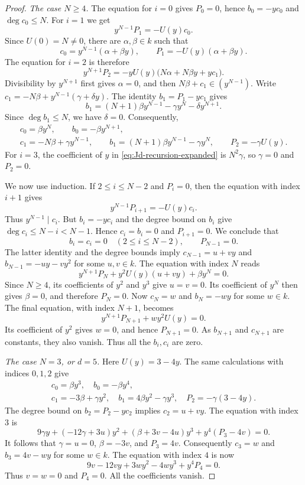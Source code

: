 \documentclass[11pt]{amsart} %
\theoremstyle{definition}
\begin{document}
\begin{proof}
\smallskip\noindent
\emph{The case $N\ge4$.}
The equation for $i=0$ gives $P_0=0$, hence $b_0=-yc_0$ and
$\deg c_0\le N$. For $i=1$ we get
\[
y^{N-1}P_1=-U(y)c_0.
\]
Since $U(0)=N\neq0$, there are $\alpha,\beta\in k$ such that
\[
c_0=y^{N-1}(\alpha+\beta y),\qquad
P_1=-U(y)(\alpha+\beta y).
\]
The equation for $i=2$ is therefore
\[
y^{N+1}P_2=-yU(y)\bigl(N\alpha+N\beta y+yc_1\bigr).
\]
Divisibility by $y^{N+1}$ first gives $\alpha=0$, and then
$N\beta+c_1\in(y^{N-1})$. Write
$c_1=-N\beta+y^{N-1}(\gamma+\delta y)$.
The identity $b_1=P_1-yc_1$ gives
\[
b_1=(N+1)\beta y^{N-1}-\gamma y^N-\delta y^{N+1}.
\]
Since $\deg b_1\le N$, we have $\delta=0$. Consequently,
\[
\begin{gathered}
c_0=\beta y^N,\qquad b_0=-\beta y^{N+1},\\
c_1=-N\beta+\gamma y^{N-1},\qquad
b_1=(N+1)\beta y^{N-1}-\gamma y^N,\qquad
P_2=-\gamma U(y).
\end{gathered}
\]
For $i=3$, the coefficient of $y$ in
\eqref{eq:Jd-recursion-expanded} is $N^2\gamma$, so $\gamma=0$
and $P_2=0$.

We now use induction. If $2\le i\le N-2$ and $P_i=0$, then the
equation with index $i+1$ gives
\[
y^{N-1}P_{i+1}=-U(y)c_i.
\]
Thus $y^{N-1}\mid c_i$. But $b_i=-yc_i$ and the degree bound on
$b_i$ give $\deg c_i\le N-i<N-1$. Hence $c_i=b_i=0$ and
$P_{i+1}=0$. We conclude that
\[
b_i=c_i=0\quad(2\le i\le N-2),\qquad P_{N-1}=0.
\]
The latter identity and the degree bounds imply
$c_{N-1}=u+vy$ and $b_{N-1}=-uy-vy^2$ for some $u,v\in k$.
The equation with index $N$ reads
\[
y^{N+1}P_N+y^2U(y)(u+vy)+\beta y^N=0.
\]
Since $N\ge4$, its coefficients of $y^2$ and $y^3$ give
$u=v=0$. Its coefficient of $y^N$ then gives $\beta=0$, and
therefore $P_N=0$.
Now $c_N=w$ and $b_N=-wy$ for some $w\in k$. The final equation,
with index $N+1$, becomes
\[
y^{N+1}P_{N+1}+wy^2U(y)=0.
\]
Its coefficient of $y^2$ gives $w=0$, and hence $P_{N+1}=0$.
As $b_{N+1}$ and $c_{N+1}$ are constants, they also vanish.
Thus all the $b_i,c_i$ are zero.

\smallskip\noindent
\emph{The case $N=3$, or $d=5$.}
Here $U(y)=3-4y$. The same calculations with indices $0,1,2$ give
\[
\begin{gathered}
c_0=\beta y^3,\quad b_0=-\beta y^4,\\
c_1=-3\beta+\gamma y^2,\quad
b_1=4\beta y^2-\gamma y^3,\quad
P_2=-\gamma(3-4y).
\end{gathered}
\]
The degree bound on $b_2=P_2-yc_2$ implies $c_2=u+vy$.
The equation with index $3$ is
\[
9\gamma y+(-12\gamma+3u)y^2
+(\beta+3v-4u)y^3+y^4(P_3-4v)=0.
\]
It follows that $\gamma=u=0$, $\beta=-3v$, and $P_3=4v$.
Consequently $c_3=w$ and $b_3=4v-wy$ for some $w\in k$.
The equation with index $4$ is now
\[
9v-12vy+3wy^2-4wy^3+y^4P_4=0.
\]
Thus $v=w=0$ and $P_4=0$. All the coefficients vanish.


\end{proof}
\end{document}
